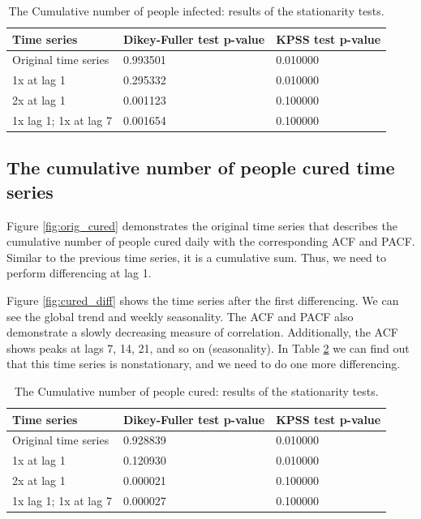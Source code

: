 \begin{table}[!ht]
    \centering
    \begin{tabular}{|p{3cm}||p{3cm}| p{3cm}|}
    \hline
    Time series & Dikey-Fuller test p-value & KPSS test p-value\\
    \hline
    Original time series& 0.993501 & 0.010000\\
    \hline
    1x at lag 1 & 0.295332 & 0.010000\\
	\hline
	2x at lag 1 & 0.001123 & 0.100000\\
	\hline
	1x lag 1; 1x at lag 7 & 0.001654 & 0.100000\\
 \hline
\end{tabular}
    \caption{The Cumulative number of people infected: results of the stationarity tests.}
    \label{tab:infected_tests_table}
\end{table}

\subsection{The cumulative number of people cured time series}

Figure \ref{fig:orig_cured} demonstrates the original time series that describes the cumulative number of people cured daily with the corresponding ACF and PACF. Similar to the previous time series, it is a cumulative sum. Thus, we need to perform differencing at lag 1. 

Figure \ref{fig:cured_diff} shows the time series after the first differencing. We can see the global trend and weekly seasonality. The ACF and PACF also demonstrate a slowly decreasing measure of correlation. Additionally, the ACF shows peaks at lags 7, 14, 21, and so on (seasonality). In Table \ref{tab:cured_tests_table} we can find out that this time series is nonstationary, and we need to do one more differencing. 

\begin{table}[!ht]
    \centering
    \begin{tabular}{|p{3cm}||p{3cm}| p{3cm}|}
    \hline
    Time series & Dikey-Fuller test p-value & KPSS test p-value\\
    \hline
    Original time series& 0.928839 & 0.010000\\
	\hline
	1x at lag 1 & 0.120930 & 0.010000\\
	\hline
	2x at lag 1 &  0.000021 & 0.100000\\
	\hline
	1x lag 1; 1x at lag 7 & 0.000027 & 0.100000\\
 \hline
\end{tabular}
    \caption{The Cumulative number of people cured: results of the stationarity tests.}
    \label{tab:cured_tests_table}
\end{table}

